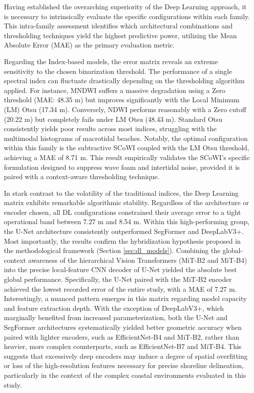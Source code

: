 ﻿\documentclass[ENG]{TFUOC}%
\begin{document}
Having established the overarching superiority of the Deep Learning approach, it is necessary to intrinsically evaluate the specific configurations within each family. This intra-family assessment identifies which architectural combinations and thresholding techniques yield the highest predictive power, utilizing the Mean Absolute Error (MAE) as the primary evaluation metric.

Regarding the Index-based models, the error matrix reveals an extreme sensitivity to the chosen binarization threshold. The performance of a single spectral index can fluctuate drastically depending on the thresholding algorithm applied. For instance, MNDWI suffers a massive degradation using a Zero threshold (MAE: 48.35 m) but improves significantly with the Local Minimum (LM) Otsu (17.34 m). Conversely, NDWI performs reasonably with a Zero cutoff (20.22 m) but completely fails under LM Otsu (48.43 m). Standard Otsu consistently yields poor results across most indices, struggling with the multimodal histograms of macrotidal beaches. Notably, the optimal configuration within this family is the subtractive SCoWI coupled with the LM Otsu threshold, achieving a MAE of 8.71 m. This result empirically validates the SCoWI's specific formulation designed to suppress wave foam and intertidal noise, provided it is paired with a context-aware thresholding technique.

In stark contrast to the volatility of the traditional indices, the Deep Learning matrix exhibits remarkable algorithmic stability. Regardless of the architecture or encoder chosen, all DL configurations constrained their average error to a tight operational band between 7.27 m and 8.54 m. Within this high-performing group, the U-Net architecture consistently outperformed SegFormer and DeepLabV3+. Most importantly, the results confirm the hybridization hypothesis proposed in the methodological framework (Section \ref{sec:dl_models}). Combining the global-context awareness of the hierarchical Vision Transformers (MiT-B2 and MiT-B4) into the precise local-feature CNN decoder of U-Net yielded the absolute best global performance. Specifically, the U-Net paired with the MiT-B2 encoder achieved the lowest recorded error of the entire study, with a MAE of 7.27 m. Interestingly, a nuanced pattern emerges in this matrix regarding model capacity and feature extraction depth. With the exception of DeepLabV3+, which marginally benefited from increased parameterization, both the U-Net and SegFormer architectures systematically yielded better geometric accuracy when paired with lighter encoders, such as EfficientNet-B4 and MiT-B2, rather than heavier, more complex counterparts, such as EfficientNet-B7 and MiT-B4. This suggests that excessively deep encoders may induce a degree of spatial overfitting or loss of the high-resolution features necessary for precise shoreline delineation, particularly in the context of the complex coastal environments evaluated in this study.
\end{document}
